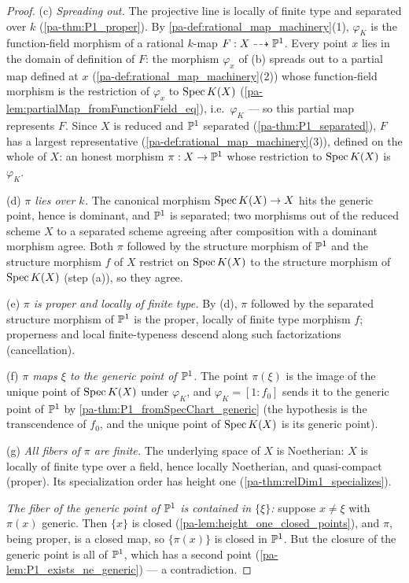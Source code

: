 \begin{proof}
  (c) \emph{Spreading out.} The projective line is locally of finite type and separated
  over \(k\) (\ref{pa-thm:P1_proper}). By \ref{pa-def:rational_map_machinery}(1), \(\varphi_K\)
  is the function-field morphism of a rational \(k\)-map
  \(F : X \dashrightarrow \mathbb{P}^1\). Every point \(x\) lies in the domain of definition of
  \(F\): the morphism \(\varphi_x\) of (b) spreads out to a partial map defined at \(x\)
  (\ref{pa-def:rational_map_machinery}(2)) whose function-field morphism is the restriction
  of \(\varphi_x\) to \(\operatorname{Spec} K(X)\) (\ref{pa-lem:partialMap_fromFunctionField_eq}), i.e.\
  \(\varphi_K\) --- so this partial map represents \(F\). Since \(X\) is reduced and
  \(\mathbb{P}^1\) separated (\ref{pa-thm:P1_separated}), \(F\) has a largest representative
  (\ref{pa-def:rational_map_machinery}(3)), defined on the whole of \(X\): an honest
  morphism \(\pi : X \to \mathbb{P}^1\) whose restriction to \(\operatorname{Spec} K(X)\) is \(\varphi_K\).

  (d) \emph{\(\pi\) lies over \(k\).} The canonical morphism \(\operatorname{Spec} K(X) \to X\) hits the
  generic point, hence is dominant, and \(\mathbb{P}^1\) is separated; two morphisms out of the
  reduced scheme \(X\) to a separated scheme agreeing after composition with a dominant
  morphism agree. Both \(\pi\) followed by the structure morphism of \(\mathbb{P}^1\) and the
  structure morphism \(f\) of \(X\) restrict on \(\operatorname{Spec} K(X)\) to the structure morphism
  of \(\operatorname{Spec} K(X)\) (step (a)), so they agree.

  (e) \emph{\(\pi\) is proper and locally of finite type.} By (d), \(\pi\) followed by the
  separated structure morphism of \(\mathbb{P}^1\) is the proper, locally of finite type
  morphism \(f\); properness and local finite-typeness descend along such factorizations
  (cancellation).

  (f) \emph{\(\pi\) maps \(\xi\) to the generic point of \(\mathbb{P}^1\).} The point
  \(\pi(\xi)\) is the image of the unique point of \(\operatorname{Spec} K(X)\) under \(\varphi_K\),
  and \(\varphi_K = [1 : f_0]\) sends it to the generic point of \(\mathbb{P}^1\) by
  \ref{pa-thm:P1_fromSpecChart_generic} (the hypothesis is the transcendence of \(f_0\), and
  the unique point of \(\operatorname{Spec} K(X)\) is its generic point).

  (g) \emph{All fibers of \(\pi\) are finite.} The underlying space of \(X\) is Noetherian:
  \(X\) is locally of finite type over a field, hence locally Noetherian, and
  quasi-compact (proper). Its specialization order has height one
  (\ref{pa-thm:relDim1_specializes}).

  \emph{The fiber of the generic point of \(\mathbb{P}^1\) is contained in \(\{\xi\}\):} suppose
  \(x \neq \xi\) with \(\pi(x)\) generic. Then \(\{x\}\) is closed
  (\ref{pa-lem:height_one_closed_points}), and \(\pi\), being proper, is a closed map, so
  \(\{\pi(x)\}\) is closed in \(\mathbb{P}^1\). But the closure of the generic point is all of
  \(\mathbb{P}^1\), which has a second point (\ref{pa-lem:P1_exists_ne_generic}) --- a
  contradiction.


\end{proof}
